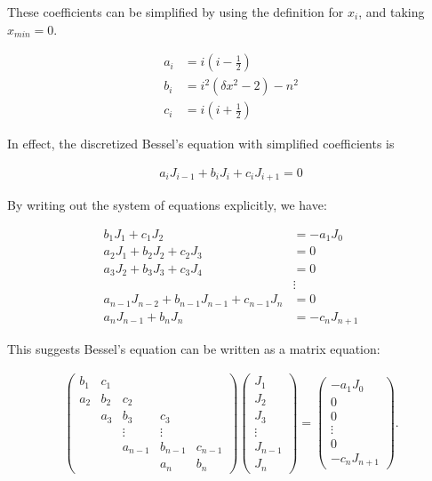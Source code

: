 \documentclass[onecolumn, groupedaddress, 10pt]{revtex4-1}
\begin{document}
These coefficients can be simplified by using the definition for $x_i$, and taking $x_{min} = 0$.

\begin{align}
a_i &= i   \left( i - \frac{1}{2} \right)				\\
b_i &= i^2 \left( \delta x^2 - 2  \right) - n^2 		 	\\
c_i &= i   \left( i + \frac{1}{2} \right)
\end{align}

In effect, the discretized Bessel's equation with simplified coefficients is

\begin{align}
a_i J_{i-1} + b_i J_i + c_i J_{i+1} = 0
\end{align}

By writing out the system of equations explicitly, we have:

\begin{align}
b_1 J_1 + c_1 J_2                                 &= - a_1 J_0		\\
a_2 J_1 + b_2 J_2 + c_2 J_3                       &= 0				\\
a_3 J_2 + b_3 J_3 + c_3 J_4                       &= 0				\\
                                                  &\vdots				\\
a_{n-1} J_{n-2} + b_{n-1} J_{n-1} + c_{n-1} J_{n} &=   0				\\
a_n J_{n-1} + b_n J_n                             &= - c_n J_{n+1}
\end{align}

This suggests Bessel's equation can be written as a matrix equation:

\begin{align}
\left( \begin{array}{ccccc}
	b_1 & c_1 &         &         &         \\
	a_2 & b_2 &   c_2   &         &         \\
	    & a_3 &   b_3   &   c_3   &         \\
	    &     & \vdots  & \vdots  &         \\
	    &     & a_{n-1} & b_{n-1} & c_{n-1} \\
	    &     &         &   a_n   &   b_n
\end{array} \right)
\left( \begin{array}{c}
	  J_1   \\
	  J_2   \\
	  J_3   \\
	\vdots  \\
	J_{n-1} \\
	  J_n
\end{array} \right)
=
\left( \begin{array}{c}
	  - a_1 J_0   \\
	      0       \\
	      0       \\
	   \vdots     \\
	      0       \\
	- c_n J_{n+1}
\end{array} \right).
\end{align}
\end{document}

